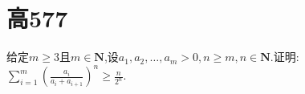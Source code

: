 \documentclass[]{article}
\title{}
\author{}
\date{}
\begin{document}
\maketitle
\section{高577}{
给定$m\geq 3$且$m \in \mathbf{N}$,设$a_1,a_2,…,a_m >0, n\geq m ,n \in \mathbf{N}$.证明:\\
$\displaystyle \sum\limits_{i=1}^m{(\frac{a_i}{a_i+a_{i+1}})^n}\geq \frac{n}{2^n}$.
}
\end{document}
